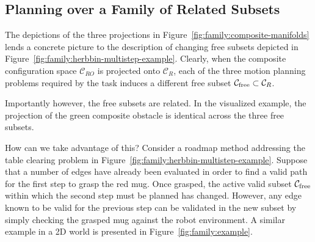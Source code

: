 \subsection{Planning over a Family of Related Subsets}

The depictions of the three projections
in Figure~\ref{fig:family:composite-manifolds}
lends a concrete picture to the description of changing free subsets
depicted in Figure~\ref{fig:family:herbbin-multistep-example}.
Clearly,
when the composite configuration space $\mathcal{C}_{RO}$
is projected onto $\mathcal{C}_{R}$,
each of the three motion planning problems required by the task
induces a different free subset
$\mathcal{C}_{\mbox{\scriptsize free}} \subset \mathcal{C}_{R}$.

Importantly however,
the free subsets are related.
In the visualized example,
the projection of the green composite obstacle is identical
across the three free subsets.

How can we take advantage of this?
Consider a roadmap method addressing the table clearing problem
in Figure~\ref{fig:family:herbbin-multistep-example}.
Suppose that a number of edges have already been evaluated in order
to find a valid path for the first step to grasp the red mug.
Once grasped, the active valid subset $\mathcal{C}_{\mbox{\scriptsize free}}$
within which the second step must be planned has changed.
However,
any edge known to be valid for the previous step
can be validated in the new subset by simply checking the grasped
mug against the robot environment.
A similar example in a 2D world is presented
in Figure~\ref{fig:family:example}.


